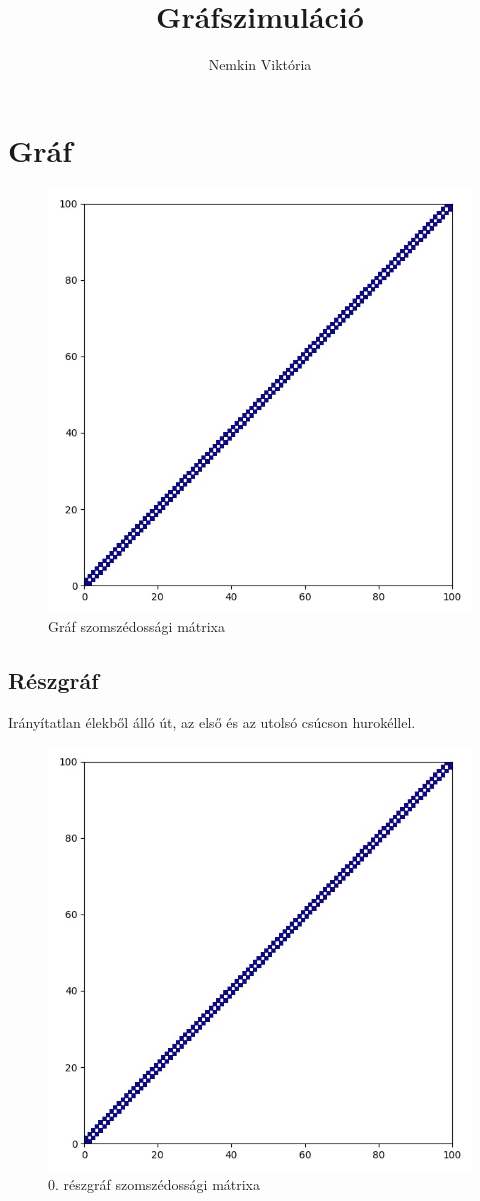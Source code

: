 \documentclass[14pt,a4paper]{article}
\title{Gráfszimuláció}
\author{Nemkin Viktória}
\date{}
\begin{document}
\maketitle
\section{Gráf}
\begin{figure}[H]
\centering
\includegraphics[width = 0.7\columnwidth]{graph.jpg}
\caption{Gráf szomszédossági mátrixa}
\end{figure}
\subsection{Részgráf}
Irányítatlan élekből álló út, az első és az utolsó csúcson hurokéllel.
\begin{figure}[H]
\centering
\includegraphics[width = 0.7\columnwidth]{subgraph_00.jpg}
\caption{0. részgráf szomszédossági mátrixa}
\end{figure}
\end{document}
